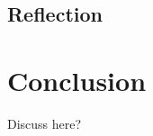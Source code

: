 \documentclass{drl-common/llncs}
\newcommand{\C}{\ensuremath{\mathcal{C}}}
\newcommand{\la}{\ensuremath{\dashv}}
\newcommand{\sh}{\text{\textesh}}
\begin{document}
\subsection{Reflection}





\section{Conclusion}

Discuss \sh{} here?


{ %


}
\end{document}
